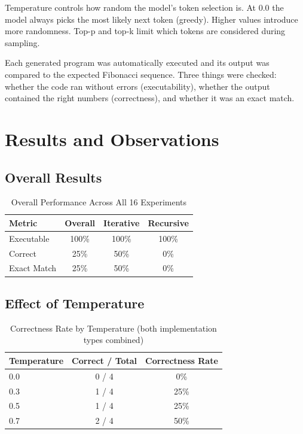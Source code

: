 \documentclass[11pt,a4paper]{article}
\begin{document}
Temperature controls how random the model's token selection is. At 0.0 the model always picks the most likely next token (greedy). Higher values introduce more randomness. Top-p and top-k limit which tokens are considered during sampling.

Each generated program was automatically executed and its output was compared to the expected Fibonacci sequence. Three things were checked: whether the code ran without errors (executability), whether the output contained the right numbers (correctness), and whether it was an exact match.

\section{Results and Observations}

\subsection{Overall Results}

\begin{table}[H]
\centering
\caption{Overall Performance Across All 16 Experiments}
\begin{tabular}{lccc}
\toprule
\textbf{Metric} & \textbf{Overall} & \textbf{Iterative} & \textbf{Recursive} \\
\midrule
Executable  & 100\% & 100\% & 100\% \\
Correct     & 25\%  & 50\%  & 0\%   \\
Exact Match & 25\%  & 50\%  & 0\%   \\
\bottomrule
\end{tabular}
\end{table}

\subsection{Effect of Temperature}

\begin{table}[H]
\centering
\caption{Correctness Rate by Temperature (both implementation types combined)}
\begin{tabular}{lcc}
\toprule
\textbf{Temperature} & \textbf{Correct / Total} & \textbf{Correctness Rate} \\
\midrule
0.0 & 0 / 4 & 0\%  \\
0.3 & 1 / 4 & 25\% \\
0.5 & 1 / 4 & 25\% \\
0.7 & 2 / 4 & 50\% \\
\bottomrule
\end{tabular}
\end{table}
\end{document}
